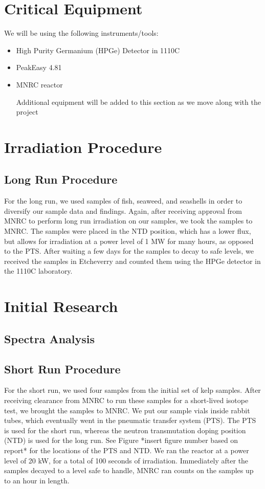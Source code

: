 \documentclass[]{article}
\begin{document}
\pagebreak

\section{Critical Equipment}
We will be using the following instruments/tools:


\begin{itemize}
\item High Purity Germanium (HPGe) Detector in 1110C
\item PeakEasy 4.81
\item MNRC reactor

Additional equipment will be added to this section as we move along with the project

\end{itemize}

\section{Irradiation Procedure}
\subsection{Long Run Procedure}

For the long run, we used samples of fish, seaweed, and seashells in order to diversify our sample data and findings.  Again, after receiving approval from MNRC to perform long run irradiation on our samples, we took the samples to MNRC.  The samples were placed in the NTD position, which has a lower flux, but allows for irradiation at a power level of 1 MW for many hours, as opposed to the PTS.  After waiting a few days for the samples to decay to safe levels, we received the samples in Etcheverry and counted them using the HPGe detector in the 1110C laboratory.
\section{Initial Research}
\subsection{Spectra Analysis}

\subsection{Short Run Procedure}
For the short run, we used four samples from the initial set of kelp samples.  After receiving clearance from MNRC to run these samples for a short-lived isotope test, we brought the samples to MNRC.  We put our sample vials inside rabbit tubes, which eventually went in the pneumatic transfer system (PTS).    The PTS is used for the short run, whereas the neutron transmutation doping position (NTD) is used for the long run.  See Figure *insert figure number based on report* for the locations of the PTS and NTD.  We ran the reactor at a power level of 20 kW, for a total of 100 seconds of irradiation.  Immediately after the samples decayed to a level safe to handle, MNRC ran counts on the samples up to an hour in length.  
\end{document}
